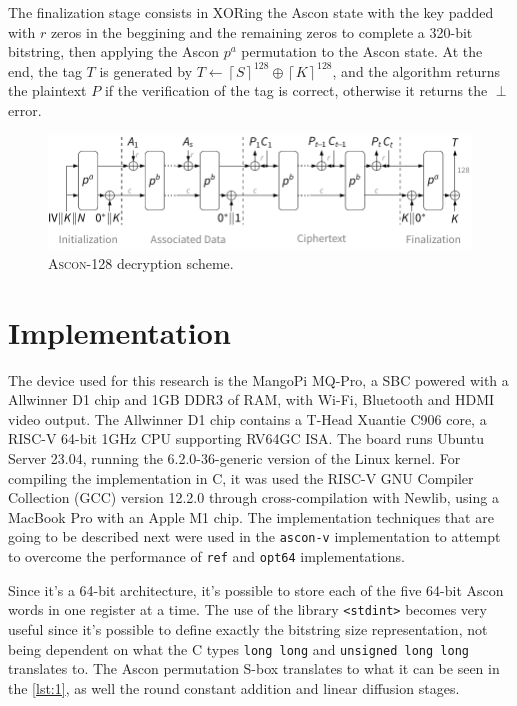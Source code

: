 \documentclass[11pt,twoside]{article}
\begin{document}
The finalization stage consists in XORing the Ascon state with the key padded with $r$ zeros in the beggining and the remaining zeros to complete a 320-bit bitstring, then applying the Ascon $p^a$ permutation to the Ascon state. At the end, the tag $T$ is generated by $T \leftarrow {\left \lceil  S \right \rceil}^{128} \oplus  {\left \lceil  K \right \rceil}^{128}$, and the algorithm returns the plaintext $P$ if the verification of the tag is correct, otherwise it returns the $\perp$ error.

\begin{figure}[h]
  \centering
  \includegraphics[scale=0.8]{assets/aead_decrypt.pdf}
  \caption{\textsc{Ascon-128} decryption scheme.}
  \label{fig:ascon128decrypt}
\end{figure}


\section{Implementation}

The device used for this research is the MangoPi MQ-Pro, a SBC powered with a Allwinner D1 chip and 1GB DDR3 of RAM, with Wi-Fi, Bluetooth and HDMI video output. The Allwinner D1 chip contains a T-Head Xuantie C906 core, a RISC-V 64-bit 1GHz CPU supporting RV64GC ISA. The board runs Ubuntu Server 23.04, running the 6.2.0-36-generic version of the Linux kernel. For compiling the implementation in C, it was used the RISC-V GNU Compiler Collection (GCC) version 12.2.0 \cite{riscvgnutoolchainv2023} through cross-compilation with Newlib, using a MacBook Pro with an Apple M1 chip. The implementation techniques that are going to be described next were used in the \texttt{ascon-v} implementation to attempt to overcome the performance of \texttt{ref} and \texttt{opt64} implementations.

Since it's a 64-bit architecture, it's possible to store each of the five 64-bit Ascon words in one register at a time. The use of the library \texttt{<stdint>} becomes very useful since it's possible to define exactly the bitstring size representation, not being dependent on what the C types \texttt{long long} and \texttt{unsigned long long} translates to. The Ascon permutation S-box translates to what it can be seen in the \cref{lst:1}, as well the round constant addition and linear diffusion stages.
\end{document}
